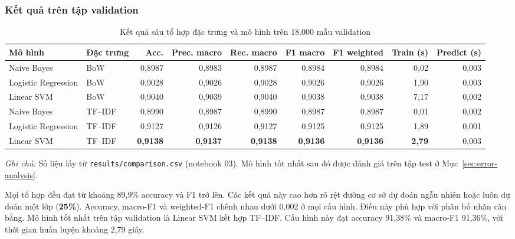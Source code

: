 \documentclass[12pt]{hcmut-report}
\begin{document}
\subsubsection{Kết quả trên tập validation}

\begin{landscape}
\begin{table}[H]
  \centering
  \caption{Kết quả sáu tổ hợp đặc trưng và mô hình trên 18.000 mẫu validation}
  \label{tab:traditional-results}
  \footnotesize
  \renewcommand{\arraystretch}{1.12}
  \setlength{\tabcolsep}{5pt}
  \begin{tabular}{llrrrrrrr}
    \toprule
    \textbf{Mô hình} & \textbf{Đặc trưng} & \textbf{Acc.} & \textbf{Prec. macro} & \textbf{Rec. macro} & \textbf{F1 macro} & \textbf{F1 weighted} & \textbf{Train (s)} & \textbf{Predict (s)} \\
    \midrule
    Naive Bayes         & BoW     & 0,8987 & 0,8983 & 0,8987 & 0,8984 & 0,8984 & 0,02 & 0,003 \\
    Logistic Regression & BoW     & 0,9028 & 0,9026 & 0,9028 & 0,9026 & 0,9026 & 1,90 & 0,003 \\
    Linear SVM          & BoW     & 0,9040 & 0,9039 & 0,9040 & 0,9038 & 0,9038 & 7,17 & 0,002 \\
    Naive Bayes         & TF--IDF & 0,8990 & 0,8987 & 0,8990 & 0,8987 & 0,8987 & 0,01 & 0,002 \\
    Logistic Regression & TF--IDF & 0,9127 & 0,9126 & 0,9127 & 0,9125 & 0,9125 & 1,89 & 0,001 \\
    Linear SVM          & TF--IDF & \textbf{0,9138} & \textbf{0,9137} & \textbf{0,9138} & \textbf{0,9136} & \textbf{0,9136} & \textbf{2,79} & 0,003 \\
    \bottomrule
  \end{tabular}
  \par\vspace{3pt}
  \parbox{0.95\textwidth}{\footnotesize\textit{Ghi chú:} Số liệu lấy từ \texttt{results/comparison.csv} (notebook 03). Mô hình tốt nhất sau đó được đánh giá trên tập test ở Mục~\ref{sec:error-analysis}.}
\end{table}
\end{landscape}

Mọi tổ hợp đều đạt từ khoảng 89,9\% accuracy và F1 trở lên. Các kết quả này cao hơn rõ rệt đường cơ sở dự đoán ngẫu nhiên hoặc luôn dự đoán một lớp (\textbf{25\%}). Accuracy, macro-F1 và weighted-F1 chênh nhau dưới 0,002 ở mọi cấu hình. Điều này phù hợp với phân bố nhãn cân bằng. Mô hình tốt nhất trên tập validation là Linear SVM kết hợp TF--IDF. Cấu hình này đạt accuracy 91,38\% và macro-F1 91,36\%, với thời gian huấn luyện khoảng 2,79 giây.
\end{document}

